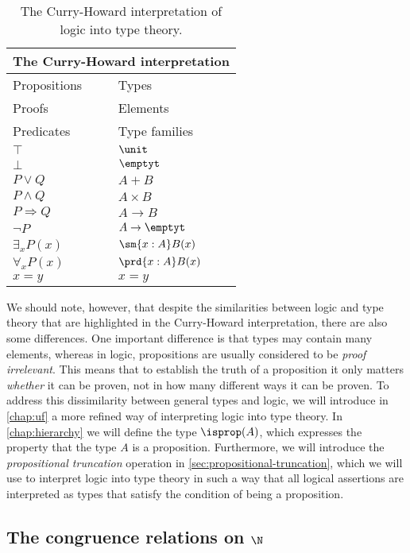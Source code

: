 \begin{table}[t]
  \begin{tabular}{ll}
    \toprule
    \multicolumn{2}{c}{The Curry-Howard interpretation} \\
    \midrule
    Propositions & Types \\
    Proofs & Elements \\
    Predicates & Type families \\
    $\top$ & $\unit$ \\
    $\bot$ & $\emptyt$ \\
    $P\lor Q$ & $A+B$ \\
    $P\land Q$ & $A\times B$ \\
    $P\Rightarrow Q$ & $A\to B$ \\
    $\neg P$ & $A\to \emptyt$ \\
    $\exists_{x}P(x)$ & $\sm{x:A}B(x)$ \\
    $\forall_{x}P(x)$ & $\prd{x:A}B(x)$ \\
    $x=y$ & $x=y$ \\
    \bottomrule
  \end{tabular}
  \caption{\label{table:Curry-Howard}The Curry-Howard interpretation of logic into type theory.}
\end{table}

\begin{rmk}
  We should note, however, that despite the similarities between logic and type theory that are highlighted in the Curry-Howard interpretation, there are also some differences. One important difference is that types may contain many elements, whereas in logic, propositions are usually considered to be \emph{proof irrelevant}. This means that to establish the truth of a proposition it only matters \emph{whether} it can be proven, not in how many different ways it can be proven. To address this dissimilarity between general types and logic, we will introduce in \cref{chap:uf} a more refined way of interpreting logic into type theory. In \cref{chap:hierarchy} we will define the type $\isprop(A)$, which expresses the property that the type $A$ is a proposition. Furthermore, we will introduce the \emph{propositional truncation} operation in \cref{sec:propositional-truncation}, which we will use to interpret logic into type theory in such a way that all logical assertions are interpreted as types that satisfy the condition of being a proposition.
\end{rmk}

\subsection{The congruence relations on \texorpdfstring{$\N$}{ℕ}}

